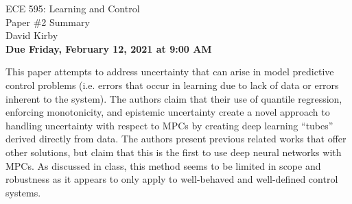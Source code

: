 \documentclass[11pt]{article}
\begin{document}
\begin{center}
\LARGE{ECE 595: Learning and Control\\Paper \#2 Summary}\\[1.5em]
\large David Kirby\\[1.5em]
\large \textbf{Due Friday, February 12, 2021 at 9:00 AM}\\[2.5em]
\end{center}

\noindent This paper attempts to address uncertainty that can arise in model predictive control problems (i.e. errors that occur in learning due to lack of data or errors inherent to the system). The authors claim that their use of quantile regression, enforcing monotonicity, and epistemic uncertainty create a novel approach to handling uncertainty with respect to MPCs by creating deep learning ``tubes'' derived directly from data. The authors present previous related works that offer other solutions, but claim that this is the first to use deep neural networks with MPCs. As discussed in class, this method seems to be limited in scope and robustness as it appears to only apply to well-behaved and well-defined control systems.
\end{document}
